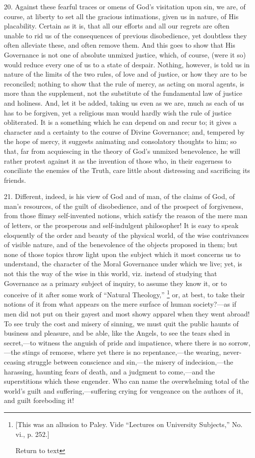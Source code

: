 20. Against these fearful traces or omens of God's visitation upon
sin, we are, of course, at liberty to set all the gracious
intimations, given us in nature, of His placability. Certain as it is,
that all our efforts and all our regrets are often unable to rid us of
the consequences of previous disobedience, yet doubtless they often
alleviate these, and often remove them. And this goes to show that His
Governance is not one of absolute unmixed justice, which, of course,
(were it so) would reduce every one of us to a state of despair.
Nothing, however, is told us in nature of the limits of the two rules,
of love and of justice, or how they are to be reconciled; nothing to
show that the rule of mercy, as acting on moral agents, is more than
the supplement, not the substitute of the fundamental law of justice
and holiness. And, let it be added, taking us even as we are, much as
each of us has to be forgiven, yet a religious man would hardly wish
the rule of justice obliterated. It is a something which he can depend
on and recur to; it gives a character and a certainty to the course of
Divine Governance; and, tempered by the hope of mercy, it suggests
animating and consolatory thoughts to him; so that, far from
acquiescing in the theory of God's unmixed benevolence, he will rather
protest against it as the invention of those who, in their eagerness
to conciliate the enemies of the Truth, care little about distressing
and sacrificing its friends.

21. Different, indeed, is his view of God and of man, of the claims
of God, of man's resources, of the guilt of disobedience, and of the
prospect of forgiveness, from those flimsy self-invented notions,
which satisfy the reason of the mere man of letters, or the prosperous
and self-indulgent philosopher! It is easy to speak eloquently of the
order and beauty of the physical world, of the wise contrivances of
visible nature, and of the benevolence of the objects proposed in
them; but none of those topics throw light upon the subject which it
most concerns us to understand, the character of the Moral Governance
under which we live; yet, is not this the way of the wise in this
world, viz. instead of studying that Governance as a primary subject
of inquiry, to assume they know it, or to conceive of it after some
work of ``Natural Theology,'' \footnote{[This was an allusion to Paley. Vide ``Lectures on University
Subjects,'' No. vi., p. 252.]

Return to text}
or, at best, to take their notions of it from what appears on the mere
surface of human society?—as if men did not put on their gayest and
most showy apparel when they went abroad! To see truly the cost and
misery of sinning, we must quit the public haunts of business and
pleasure, and be able, like the Angels, to see the tears shed in
secret,—to witness the anguish of pride and impatience, where there
is no sorrow,—the stings of remorse, where yet there is no
repentance,—the wearing, never-ceasing struggle between conscience
and sin,—the misery of indecision,—the harassing, haunting fears
of death, and a judgment to come,—and the superstitions which these
engender. Who can name the overwhelming total of the world's guilt and
suffering,—suffering crying for vengeance on the authors of it, and
guilt foreboding it!

